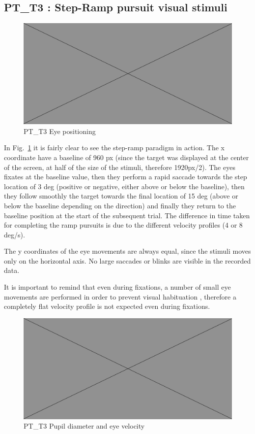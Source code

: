 \subsection{PT\_T3 : Step-Ramp pursuit visual stimuli}
\label{sec:PT_T3}

\begin{figure}[h]
  \centering
  \includegraphics[width=.5\textwidth]{figures/placeholderImg.jpg}
  \caption[PT\_T3 Eye positioning]{PT\_T3 Eye positioning}
  \label{fig:PT_T3_pos}
\end{figure}

In Fig.~\ref{fig:PT_T3_pos} it is fairly clear to see the step-ramp paradigm in action. The x coordinate have a baseline of 960 px (since the target was displayed at the center of the screen, at half of the size of the stimuli, therefore 1920px/2). The eyes fixates at the baseline value, then they perform a rapid saccade towards the step location of 3 deg (positive or negative, either above or below the baseline), then they follow smoothly the target towards the final location of 15 deg (above or below the baseline depending on the direction) and finally they return to the baseline position at the start of the subsequent trial. The difference in time taken for completing the ramp pursuits is due to the different velocity profiles (4 or 8 deg/s).

The y coordinates of the eye movements are always equal, since the stimuli moves only on the horizontal axis. No large saccades or blinks are visible in the recorded data.

It is important to remind that even during fixations, a number of small eye movements are performed in order to prevent visual habituation \citep[p. 3]{leigh2015neurology}, therefore a completely flat velocity profile is not expected even during fixations.

\begin{figure}[h]
  \centering
  \includegraphics[width=.5\textwidth]{figures/placeholderImg.jpg}
  \caption[PT\_T3 pupil velocity]{PT\_T3 Pupil diameter and eye velocity}
  \label{fig:PT_T3_vel}
\end{figure}

